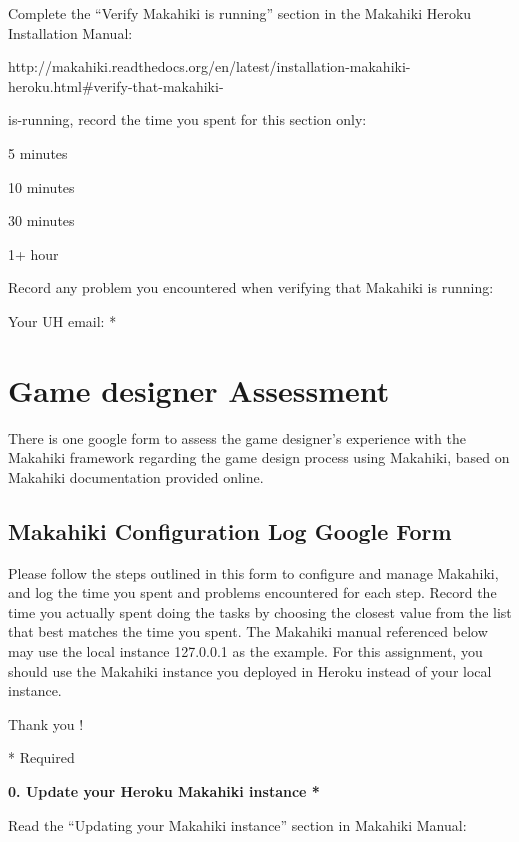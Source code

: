 Complete the ``Verify Makahiki is running'' section in the Makahiki Heroku Installation Manual:

http://makahiki.readthedocs.org/en/latest/installation-makahiki-heroku.html\#verify-that-makahiki-

is-running, record the time you spent for this section only:

\begin{radiobutton}
\item 5 minutes
\item  10 minutes
\item  30 minutes
\item  1+ hour
\end{radiobutton}

Record any problem you encountered when verifying that Makahiki is running: \underline{\hspace{3cm}}

Your UH email: * \underline{\hspace{4cm}}

\section{Game designer Assessment}
\label{app:googleform-design}

There is one google form to assess the game designer's experience with the Makahiki framework regarding the game design process using  Makahiki, based on Makahiki documentation provided online.

\subsection{Makahiki Configuration Log Google Form}

Please follow the steps outlined in this form to configure and manage Makahiki, and log the time you spent and problems encountered for each step. Record the time you actually spent doing the tasks by choosing the closest value from the list that best matches the time you spent.
The Makahiki manual referenced below may use the local instance 127.0.0.1 as the example. For this assignment, you should use the Makahiki instance you deployed in Heroku instead of your local instance.

Thank you !

* Required

{\bf 0. Update your Heroku Makahiki instance *}

Read the ``Updating your Makahiki instance'' section in Makahiki Manual:

